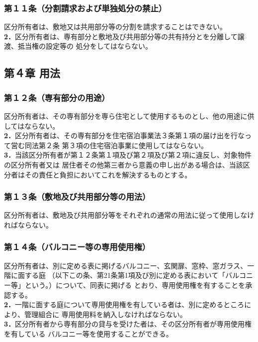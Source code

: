 \documentclass[12pt,uplatex,dvipdfmx]{jsarticle}
\begin{document}
\subsubsection*{第１１条（分割請求および単独処分の禁止）}
区分所有者は、敷地又は共用部分等の分割を請求することはできない。\\
\textbf{2．}区分所有者は、専有部分と敷地及び共用部分等の共有持分とを分離して譲渡、抵当権の設定等の
処分をしてはならない。

\begin{center}
\subsection*{第４章 用法}
\end{center}
\subsubsection*{第１２条（専有部分の用途）}
区分所有者は、その専有部分を専ら住宅として使用するものとし、他の用途に供してはならない。\\
\textbf{2．}区分所有者は、その専有部分を住宅宿泊事業法３条第１項の届け出を行なって営む同法第２条
第３項の住宅宿泊事業に使用してはならない。\\
\textbf{3．}当該区分所有者が第１２条第１項及び第２項及び第２項に違反し、対象物件の区分所有者又は
居住者その他第三者から意義の申し出がある場合は、当該区分者はその責任と負担においてこれを解決するものとする。
\subsubsection*{第１３条（敷地及び共用部分等の用法）}
区分所有者は、敷地及び共用部分等をそれぞれの通常の用法に従って使用しなければならない。
\subsubsection*{第１４条（バルコニー等の専用使用権）}
区分所有者は、別に定める表に掲げるバルコニー、玄関扉、窓枠、窓ガラス、一階に面する庭
（以下この条、第21条第1項及び別に定める表において「バルコニー等」という。）について、同表に掲げる
とおり、専用使用権を有することを承認する。\\
\textbf{2．}一階に面する庭について専用使用権を有している者は、別に定めるところにより、管理組合に
専用使用料を納入しなければならない。\\
\textbf{3．}区分所有者から専有部分の貸与を受けた者は、その区分所有者が専用使用権を有している
バルコニー等を使用することができる。
\end{document}
